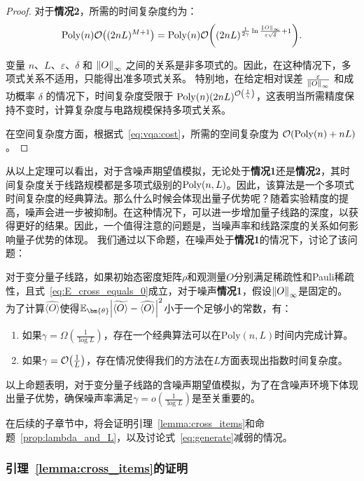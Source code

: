 \begin{proof}
对于\textbf{情况2}，所需的时间复杂度约为：
\begin{equation}
  \mathrm{Poly}(n)\order{(2nL)^{M+1}}
  =
  \mathrm{Poly}(n)  \order{(2nL)^{\frac{1}{2\gamma} \ln{\frac{\norm{O}_\infty}{\varepsilon \sqrt{\delta}}}+1}}.
\end{equation}

变量 $n$、$L$、$\varepsilon$、$\delta$ 和 $\norm{O}_\infty$ 之间的关系是非多项式的。因此，在这种情况下，多项式关系不适用，只能得出准多项式关系。
特别地，在给定相对误差 $\frac{\varepsilon}{\norm{O}_\infty}$ 和成功概率 $\delta$ 的情况下，时间复杂度受限于 $\mathrm{Poly}(n)  (2nL)^{\order{\frac{1}{\gamma}}}$，这表明当所需精度保持不变时，计算复杂度与电路规模保持多项式关系。

在空间复杂度方面，根据式~\eqref{eq:vqa:cost}，所需的空间复杂度为 $\order{\mathrm{Poly}(n)+nL}$。
\end{proof}

\begin{remark}
    从以上定理可以看出，对于含噪声期望值模拟，无论处于\textbf{情况1}还是\textbf{情况2}，其时间复杂度关于线路规模都是多项式级别的$\text{Poly}(n,L)$。因此，该算法是一个多项式时间复杂度的经典算法。那么什么时候会体现出量子优势呢？随着实验精度的提高，噪声会进一步被抑制。在这种情况下，可以进一步增加量子线路的深度，以获得更好的结果。因此，一个值得注意的问题是，当噪声率和线路深度的关系如何影响量子优势的体现。
    我们通过以下命题，在噪声处于\textbf{情况1}的情况下，讨论了该问题：
\end{remark}
\begin{proposition}
    \label{prop:lambda_and_L}
    对于变分量子线路，如果初始态密度矩阵$\rho$和观测量$O$分别满足稀疏性和Pauli稀疏性，且式~\eqref{eq:E_cross_equals_0}成立，对于噪声\textbf{情况1}，假设$\norm{O}_\infty$是固定的。
    为了计算$\widehat{\langle O\rangle}$使得$\mathbb{E}_{\bm{\theta}}\abs{\widetilde{\langle O\rangle}-\widehat{\langle O\rangle}}^2$小于一个足够小的常数，有：
    \begin{enumerate}
        \item 如果$\gamma=\Omega(\frac{1}{\log{L}})$，存在一个经典算法可以在$\mathrm{Poly}\left(n,L\right)$时间内完成计算。
        \item 如果$\gamma=\order{\frac{1}{L}}$，存在情况使得我们的方法在$L$方面表现出指数时间复杂度。
    \end{enumerate}
\end{proposition}
以上命题表明，对于变分量子线路的含噪声期望值模拟，为了在含噪声环境下体现出量子优势，确保噪声率满足$\gamma=o(\frac{1}{\log{L}})$是至关重要的。

在后续的子章节中，将会证明引理~\ref{lemma:cross_items}和命题~\ref{prop:lambda_and_L}，以及讨论式~\eqref{eq:generate}减弱的情况。

\subsubsection{引理~\ref{lemma:cross_items}的证明}\label{temp:subsubsection:cross_items}